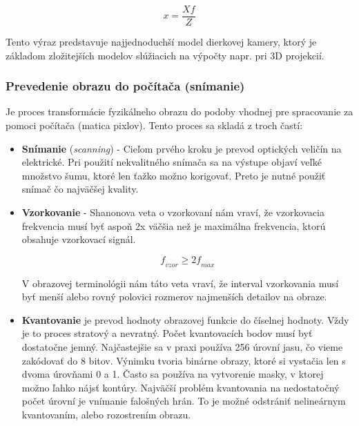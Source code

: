 \begin{equation}
    \textit{x}=\frac{X\textit{f}}{Z}
\end{equation}

Tento výraz predstavuje najjednoduchší model dierkovej kamery, ktorý je základom zložitejších modelov slúžiacich na výpočty napr. pri 3D projekcií. 

\subsubsection{Prevedenie obrazu do počítača (snímanie)}
Je proces transformácie fyzikálneho obrazu do podoby vhodnej pre spracovanie za pomoci počítača (matica pixlov). Tento proces sa skladá z troch častí:
\begin{itemize}
\item \textbf{Snímanie} (\textit{scanning}) - Cieľom prvého kroku je prevod optických veličín na elektrické. Pri použití nekvalitného snímača sa na výstupe objaví veľké množstvo šumu, ktoré len ťažko možno korigovať. Preto je nutné použiť snímač čo najväčšej kvality. \cite{Analysis_and_Machine_Vision}

\item \textbf{Vzorkovanie} \cite{Analysis_and_Machine_Vision} - Shanonova veta o vzorkovaní nám vraví, že vzorkovacia frekvencia musí byť aspoň 2x väčšia než je maximálna frekvencia, ktorú obsahuje vzorkovací signál. \cite{Analysis_and_Machine_Vision}

\begin{equation}
    \textit{f}_{\textit{vzor}} \ge {2} \textit{f}_{\textit{max}}
\end{equation}

V obrazovej terminológii nám táto veta vraví, že interval vzorkovania musí byť menší alebo rovný polovici rozmerov najmenších detailov na obraze. 

\item \textbf{Kvantovanie} je prevod hodnoty obrazovej funkcie do číselnej hodnoty. Vždy je to proces stratový a nevratný. Počet kvantovacích bodov musí byť dostatočne jemný. Najčastejšie sa v praxi používa 256 úrovní jasu, čo vieme zakódovať do 8 bitov. Výnimku tvoria binárne obrazy, ktoré si vystačia len s dvoma úrovňami 0 a 1. Často sa používa na vytvorenie masky, v ktorej možno ľahko nájsť kontúry. Najväčší problém kvantovania na nedostatočný počet úrovní je vnímanie falošných hrán. To je možné odstrániť nelineárnym kvantovaním, alebo rozostrením obrazu. \cite{Analysis_and_Machine_Vision}



\end{itemize}
